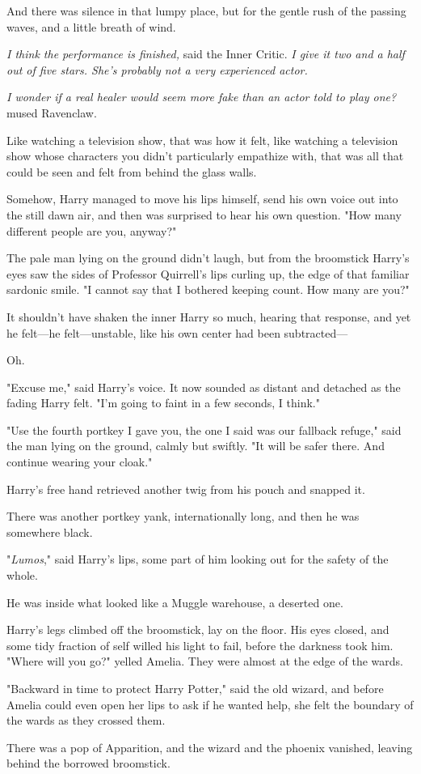 And there was silence in that lumpy place, but for the gentle rush of the 
passing waves, and a little breath of wind.

\emph{I think the performance is finished,} said the Inner Critic. \emph{I give 
it two and a half out of five stars. She's probably not a very experienced 
actor.}

\emph{I wonder if a real healer would seem more fake than an actor told to play 
one?} mused Ravenclaw.

Like watching a television show, that was how it felt, like watching a 
television show whose characters you didn't particularly empathize with, that 
was all that could be seen and felt from behind the glass walls.

Somehow, Harry managed to move his lips himself, send his own voice out into 
the still dawn air, and then was surprised to hear his own question. "How many 
different people are you, anyway?"

The pale man lying on the ground didn't laugh, but from the broomstick Harry's 
eyes saw the sides of Professor Quirrell's lips curling up, the edge of that 
familiar sardonic smile. "I cannot say that I bothered keeping count. How many 
are you?"

It shouldn't have shaken the inner Harry so much, hearing that response, and 
yet he felt---he felt---unstable, like his own center had been subtracted---

Oh.

"Excuse me," said Harry's voice. It now sounded as distant and detached as the 
fading Harry felt. "I'm going to faint in a few seconds, I think."

"Use the fourth portkey I gave you, the one I said was our fallback refuge," 
said the man lying on the ground, calmly but swiftly. "It will be safer there. 
And continue wearing your cloak."

Harry's free hand retrieved another twig from his pouch and snapped it.

There was another portkey yank, internationally long, and then he was somewhere
black.

"\emph{Lumos}," said Harry's lips, some part of him looking out for the safety 
of the whole.

He was inside what looked like a Muggle warehouse, a deserted one.

Harry's legs climbed off the broomstick, lay on the floor. His eyes closed, and
some tidy fraction of self willed his light to fail, before the darkness took 
him.
\sbreak
"Where will you go?" yelled Amelia. They were almost at the edge of the wards.

"Backward in time to protect Harry Potter," said the old wizard, and before 
Amelia could even open her lips to ask if he wanted help, she felt the boundary
of the wards as they crossed them.

There was a pop of Apparition, and the wizard and the phoenix vanished, leaving
behind the borrowed broomstick.
